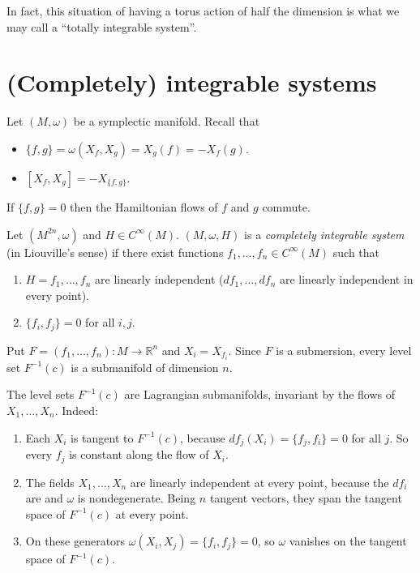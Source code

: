 In fact, this situation of having a torus
action of half the dimension
is what we may call a ``totally integrable
system''.

\section{(Completely) integrable systems}
\label{section-completely-integrable-systems}

\noindent
Let $(M,\omega)$ be a symplectic manifold.
Recall that

\begin{itemize}
\item
$\{f,g\}=\omega(X_f,X_g)=X_g(f)=-X_f(g)$.
\item $[X_f,X_g]=-X_{\{f,g\}}$.
\end{itemize}

\noindent
If $\{f,g\}=0$ then the Hamiltonian flows of
$f$ and $g$ commute.

\begin{definition}
\label{definition-compl-integ-syste}
Let $(M^{2n},\omega)$ and $H \in
C^\infty(M)$.
$(M,\omega,H)$ is a {\it completely
integrable system}
(in Liouville's sense)
if there exist functions $f_1,\ldots,f_n \in
C^\infty(M)$ such that
\begin{enumerate}
\item $H=f_1,\ldots,f_n$ are linearly
independent
($df_1,\ldots,df_n$ are linearly independent
in every point).

\item $\{ f_i, f_j\}=0$ for all $i,j$.
\end{enumerate}
\end{definition}

\noindent
Put $F=(f_1,\ldots,f_n):M \to
\mathbb{R}^n$ and $X_i=X_{f_i}$.
Since $F$ is a submersion, every level set
$F^{-1}(c)$ is a submanifold of dimension
$n$.

The level sets $F^{-1}(c)$ are Lagrangian
submanifolds, invariant by the flows of
$X_1,\ldots,X_n$.
Indeed:
\begin{enumerate}
\item
Each $X_i$ is tangent to $F^{-1}(c)$,
because
$df_j(X_i)=\{f_j,f_i\}=0$ for all $j$.
So every $f_j$ is constant along the flow
of $X_i$.

\item
The fields $X_1,\ldots,X_n$ are linearly
independent at every point, because the
$df_i$ are and $\omega$ is nondegenerate.
Being $n$ tangent vectors, they span the
tangent space of $F^{-1}(c)$ at every
point.

\item
On these generators
$\omega(X_i,X_j)=\{f_i,f_j\}=0$,
so $\omega$ vanishes on the tangent space
of $F^{-1}(c)$.
\end{enumerate}

